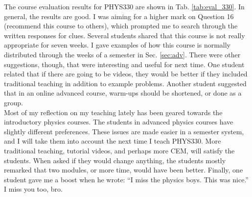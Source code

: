 \documentclass[../../main.tex]{subfiles}
\begin{document}
The course evaluation results for PHYS330 are shown in Tab. \ref{tab:eval_330}.  In general, the results are good.  I was aiming for a higher mark on Question 16 (recommend this course to others), which prompted me to search through the written responses for clues. Several students shared that this course is not really appropriate for seven weeks.  I gave examples of how this course is normally distributed through the weeks of a semester in Sec. \ref{sec:adv}.  There were other suggestions, though, that were interesting and useful for next time.  One student related that if there are going to be videos, they would be better if they included traditional teaching in addition to example problems.  Another student suggested that in an online advanced course, warm-ups should be shortened, or done as a group.
\\
\vspace{0.15cm}
Most of my reflection on my teaching lately has been geared towards the introductory physics courses.  The students in advanced physics courses have slightly different preferences.  These issues are made easier in a semester system, and I will take them into account the next time I teach PHYS330.  More traditional teaching, tutorial videos, and perhaps more CEM, will satisfy the students.  When asked if they would change anything, the students mostly remarked that two modules, or more time, would have been better.  Finally, one student gave me a boost when he wrote: ``I miss the physics boys.  This was nice.''  I miss you too, bro.
\end{document}
